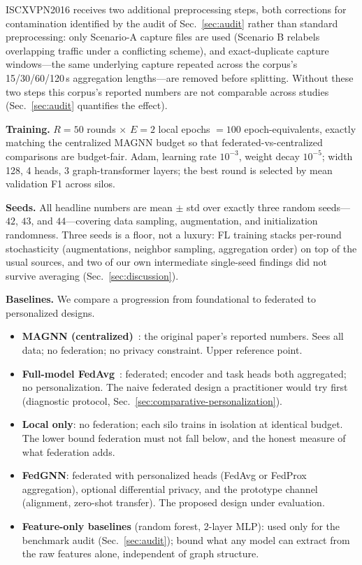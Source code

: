 \documentclass[journal]{IEEEtran}
\begin{document}
ISCXVPN2016 receives two additional preprocessing steps, both
corrections for contamination identified by the audit of
Sec.~\ref{sec:audit} rather than standard preprocessing: only
Scenario-A capture files are used (Scenario B relabels overlapping
traffic under a conflicting scheme), and exact-duplicate capture
windows---the same underlying capture repeated across the corpus's
15/30/60/120\,s aggregation lengths---are removed before splitting.
Without these two steps this corpus's reported numbers are not
comparable across studies (Sec.~\ref{sec:audit} quantifies the effect).

\textbf{Training.} $R{=}50$ rounds $\times$ $E{=}2$ local epochs
$=100$ epoch-equivalents, exactly matching the centralized MAGNN
budget so that federated-vs-centralized comparisons are budget-fair.
Adam, learning rate $10^{-3}$, weight decay $10^{-5}$; width 128,
4 heads, 3 graph-transformer layers; the best round is selected by
mean validation F1 across silos.

\textbf{Seeds.} All headline numbers are mean $\pm$ std over exactly
three random seeds---$42$, $43$, and $44$---covering data sampling,
augmentation, and initialization randomness. Three seeds is a floor, not a luxury: FL
training stacks per-round stochasticity (augmentations, neighbor
sampling, aggregation order) on top of the usual sources, and two of
our own intermediate single-seed findings did not survive averaging
(Sec.~\ref{sec:discussion}).

\textbf{Baselines.} We compare a progression from foundational to
federated to personalized designs.
\begin{itemize}
\item \textbf{MAGNN (centralized)}~\cite{magnn}: the original paper's
reported numbers. Sees all data; no federation; no privacy constraint.
Upper reference point.
\item \textbf{Full-model FedAvg}~\cite{fedavg}: federated; encoder and
task heads both aggregated; no personalization. The naive federated
design a practitioner would try first (diagnostic protocol,
Sec.~\ref{sec:comparative-personalization}).
\item \textbf{Local only}: no federation; each silo trains in
isolation at identical budget. The lower bound federation must not
fall below, and the honest measure of what federation adds.
\item \textbf{FedGNN}: federated with personalized heads
(FedAvg or FedProx aggregation), optional differential privacy, and
the prototype channel (alignment, zero-shot transfer). The proposed
design under evaluation.
\item \textbf{Feature-only baselines} (random forest, 2-layer MLP):
used only for the benchmark audit (Sec.~\ref{sec:audit}); bound what
any model can extract from the raw features alone, independent of
graph structure.
\end{itemize}
\end{document}
